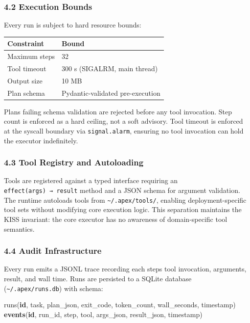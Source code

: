 \documentclass[
]{article}
\newenvironment{Shaded}{}{}
\newcommand{\DataTypeTok}[1]{\textcolor[rgb]{0.56,0.13,0.00}{#1}}
\newcommand{\KeywordTok}[1]{\textcolor[rgb]{0.00,0.44,0.13}{\textbf{#1}}}
\newcommand{\NormalTok}[1]{#1}
\begin{document}
\subsubsection{4.2 Execution Bounds}\label{42-execution-bounds}

Every run is subject to hard resource bounds:

\begin{longtable}[]{@{}ll@{}}
\toprule\noalign{}
Constraint & Bound \\
\midrule\noalign{}
\endhead
\bottomrule\noalign{}
\endlastfoot
Maximum steps & 32 \\
Tool timeout & 300 s (SIGALRM, main thread) \\
Output size & 10 MB \\
Plan schema & Pydantic-validated pre-execution \\
\end{longtable}

Plans failing schema validation are rejected before any tool invocation.
Step count is enforced as a hard ceiling, not a soft advisory. Tool
timeout is enforced at the syscall boundary via \texttt{signal.alarm},
ensuring no tool invocation can hold the executor indefinitely.

\subsubsection{4.3 Tool Registry and
Autoloading}\label{43-tool-registry-and-autoloading}

Tools are registered against a typed interface requiring an
\texttt{effect(args)\ →\ result} method and a JSON schema for argument
validation. The runtime autoloads tools from
\texttt{\textasciitilde{}/.apex/tools/}, enabling deployment-specific
tool sets without modifying core execution logic. This separation
maintains the KISS invariant: the core executor has no awareness of
domain-specific tool semantics.

\subsubsection{4.4 Audit Infrastructure}\label{44-audit-infrastructure}

Every run emits a JSONL trace recording each step\textquotesingle s tool
invocation, arguments, result, and wall time. Runs are persisted to a
SQLite database (\texttt{\textasciitilde{}/.apex/runs.db}) with schema:

\begin{Shaded}
\begin{Highlighting}[]
\NormalTok{runs(}\KeywordTok{id}\NormalTok{, task, plan\_json, exit\_code, token\_count, wall\_seconds, }\DataTypeTok{timestamp}\NormalTok{)}
\KeywordTok{events}\NormalTok{(}\KeywordTok{id}\NormalTok{, run\_id, step, tool, args\_json, result\_json, }\DataTypeTok{timestamp}\NormalTok{)}
\end{Highlighting}
\end{Shaded}
\end{document}
